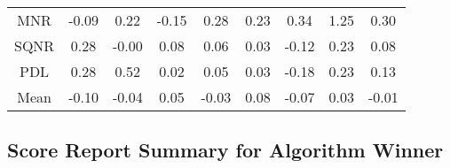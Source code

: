 \begin{longtable}{ | c || c | c | c | c | c | c | c || c |}
MNR &  \cellcolor[HTML]{FFFFFF} -0.09 &  \cellcolor[HTML]{F7F7FF} 0.22 &  \cellcolor[HTML]{FFFFFF} -0.15 &  \cellcolor[HTML]{F7F7FF} 0.28 &  \cellcolor[HTML]{F7F7FF} 0.23 &  \cellcolor[HTML]{F7F7FF} 0.34 &  \cellcolor[HTML]{DFDFFF} 1.25 &  \cellcolor[HTML]{F7F7FF} 0.30 \\
SQNR &  \cellcolor[HTML]{F7F7FF} 0.28 &  \cellcolor[HTML]{FFFFFF} -0.00 &  \cellcolor[HTML]{FFFFFF} 0.08 &  \cellcolor[HTML]{FFFFFF} 0.06 &  \cellcolor[HTML]{FFFFFF} 0.03 &  \cellcolor[HTML]{FFFFFF} -0.12 &  \cellcolor[HTML]{F7F7FF} 0.23 &  \cellcolor[HTML]{FFFFFF} 0.08 \\
PDL &  \cellcolor[HTML]{F7F7FF} 0.28 &  \cellcolor[HTML]{EFEFFF} 0.52 &  \cellcolor[HTML]{FFFFFF} 0.02 &  \cellcolor[HTML]{FFFFFF} 0.05 &  \cellcolor[HTML]{FFFFFF} 0.03 &  \cellcolor[HTML]{FFF7F7} -0.18 &  \cellcolor[HTML]{F7F7FF} 0.23 &  \cellcolor[HTML]{FFFFFF} 0.13 \\
\hline
\hline
Mean  &  \cellcolor[HTML]{FFFFFF} -0.10 &  \cellcolor[HTML]{FFFFFF} -0.04 &  \cellcolor[HTML]{FFFFFF} 0.05 &  \cellcolor[HTML]{FFFFFF} -0.03 &  \cellcolor[HTML]{FFFFFF} 0.08 &  \cellcolor[HTML]{FFFFFF} -0.07 &  \cellcolor[HTML]{FFFFFF} 0.03 &  \cellcolor[HTML]{FFFFFF} -0.01 \\
\hline
\end{longtable}

\subsection*{Score Report Summary for Algorithm Winner}

